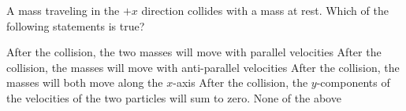 \documentclass{../../oss-classkick-exam}
\begin{document}
\begin{multicols*}{2}
\begin{questions}
%
%

    \question A mass traveling in the $+x$ direction collides with a mass at
    rest. Which of the following statements is true?
    \begin{choices}
      \choice After the collision, the two masses will move with parallel
      velocities
      \choice After the collision, the masses will move with anti-parallel
      velocities
      \choice After the collision, the masses will both move along the $x$-axis
      \choice After the collision, the $y$-components of the velocities of the
      two particles will sum to zero.
      \choice None of the above
    \end{choices}
    \columnbreak
    

\end{questions}
\end{multicols*}
\end{document}

